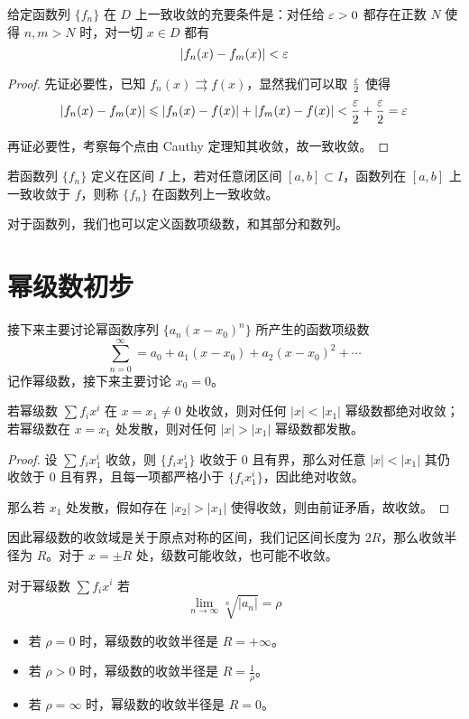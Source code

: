 \begin{theorem}
	给定函数列 $\{f_n\}$ 在 $D$ 上一致收敛的充要条件是：对任给 $\varepsilon > 0$ 都存在正数 $N$ 使得 $n, m > N$ 时，对一切 $x \in D$ 都有
	\[ |f_n(x) - f_m(x) | < \varepsilon \]
\end{theorem}

\begin{proof}
	先证必要性，已知 $f_n(x) \rightrightarrows f(x)$，显然我们可以取 $\frac{\varepsilon}{2}$ 使得
	\[ |f_n(x) - f_m(x)| \leqslant |f_n(x) - f(x)| + |f_m(x) - f(x)| < \frac{\varepsilon}{2} + \frac{\varepsilon}{2} = \varepsilon \]
	
	再证必要性，考察每个点由 Cauthy 定理知其收敛，故一致收敛。
\end{proof}


\begin{definition}
	若函数列 $\{f_n\}$ 定义在区间 $I$ 上，若对任意闭区间 $[a, b] \subset I$，函数列在 $[a, b]$ 上一致收敛于 $f$，则称 $\{f_n\}$ 在函数列上一致收敛。
\end{definition}


对于函数列，我们也可以定义函数项级数，和其部分和数列。

\section{幂级数初步}

接下来主要讨论幂函数序列 $\{a_n(x- x_0)^n \}$ 所产生的函数项级数
\[ \sum_{n=0}^{\infty} = a_0 + a_1(x-x_0) + a_2(x-x_0)^2 + \cdots \]
记作幂级数，接下来主要讨论 $x_0 = 0$。

\begin{theorem}
	若幂级数 $\sum f_i x^i$ 在 $x = x_1 \neq 0$ 处收敛，则对任何 $|x| < |x_1|$ 幂级数都绝对收敛；若幂级数在 $x = x_1$ 处发散，则对任何 $|x| > |x_1|$ 幂级数都发散。
\end{theorem}

\begin{proof}
	设 $\sum f_i x_1^i$ 收敛，则 $\{f_i x_1^i\}$ 收敛于 $0$ 且有界，那么对任意 $|x| < |x_1|$ 其仍收敛于 $0$ 且有界，且每一项都严格小于 $\{f_i x_1^i\}$，因此绝对收敛。
	
	那么若 $x_1$ 处发散，假如存在 $|x_2| > |x_1|$ 使得收敛，则由前证矛盾，故收敛。
\end{proof}

因此幂级数的收敛域是关于原点对称的区间，我们记区间长度为 $2R$，那么收敛半径为 $R$。对于 $x = \pm R$ 处，级数可能收敛，也可能不收敛。

\begin{theorem}
	对于幂级数 $\sum f_i x^i$ 若
	\[ \lim_{n \to \infty} \sqrt[n]{|a_n|} = \rho \]
	\begin{itemize}
		\item 若 $\rho = 0$ 时，幂级数的收敛半径是 $R = +\infty$。
		\item 若 $\rho > 0$ 时，幂级数的收敛半径是 $R = \frac{1}{\rho}$。
		\item 若 $\rho = \infty$ 时，幂级数的收敛半径是 $R = 0$。
	\end{itemize}
\end{theorem}


